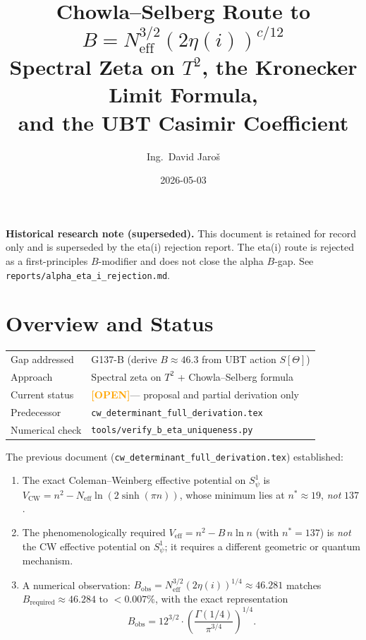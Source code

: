 \documentclass[12pt,a4paper]{article}
\title{\textbf{Chowla--Selberg Route to $B = N_{\mathrm{eff}}^{3/2}(2\eta(i))^{c/12}$}\\
         \large Spectral Zeta on $T^2$, the Kronecker Limit Formula,\\
         and the UBT Casimir Coefficient}
\author{Ing.\ David Jaro\v{s}}
\date{2026-05-03}
\theoremstyle{definition}
\theoremstyle{remark}
\newcommand{\OPEN}{\textcolor{orange}{\textbf{[OPEN]}}}
\begin{document}
  \maketitle
\fi

\begin{warnbox}
\textbf{Historical research note (superseded).}
This document is retained for record only and is superseded by the eta(i)
rejection report. The eta(i) route is rejected as a first-principles
$B$-modifier and does not close the alpha $B$-gap.
See \texttt{reports/alpha\_eta\_i\_rejection.md}.
\end{warnbox}

\section{Overview and Status}
\label{sec:cs:overview}

\begin{tcolorbox}[colback=yellow!6!white, colframe=orange!70!black,
                  title=\textbf{Document Status}]
\begin{tabular}{ll}
Gap addressed  & G137-B (derive $B \approx 46.3$ from UBT action $S[\Theta]$) \\
Approach       & Spectral zeta on $T^2$ + Chowla--Selberg formula \\
Current status & \OPEN --- proposal and partial derivation only \\
Predecessor    & \texttt{cw\_determinant\_full\_derivation.tex} \\
Numerical check & \texttt{tools/verify\_b\_eta\_uniqueness.py}
\end{tabular}
\end{tcolorbox}

\medskip

The previous document (\texttt{cw\_determinant\_full\_derivation.tex}) established:
\begin{enumerate}
  \item The exact Coleman--Weinberg effective potential on $S^1_\psi$ is
        $V_{\mathrm{CW}} = n^2 - N_{\mathrm{eff}}\ln(2\sinh(\pi n))$,
        whose minimum lies at $n^* \approx 19$, \emph{not} $137$.
  \item The phenomenologically required $V_{\mathrm{eff}} = n^2 - B\,n\ln n$
        (with $n^* = 137$) is \emph{not} the CW effective potential on $S^1_\psi$;
        it requires a different geometric or quantum mechanism.
  \item A numerical observation: $B_{\mathrm{obs}} = N_{\mathrm{eff}}^{3/2}(2\eta(i))^{1/4}
        \approx 46.281$ matches $B_{\mathrm{required}} \approx 46.284$ to $<0.007\%$,
        with the exact representation
        \begin{equation}
          B_{\mathrm{obs}}
          = 12^{3/2}\cdot\left(\frac{\Gamma(1/4)}{\pi^{3/4}}\right)^{1/4}.
          \label{eq:cs:Bobs}
        \end{equation}
\end{enumerate}
\end{document}
